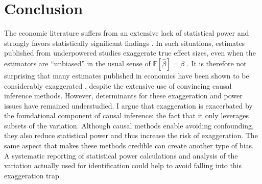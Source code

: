 \documentclass[usletter, 12pt]{article}
\begin{document}



\section{Conclusion} \label{conclusion}

	The economic literature suffers from an extensive lack of statistical power \citep{ioannidis_power_2017} and strongly favors statistically significant findings \citep[for instance]{rosenthal_file_1979, andrews_identification_2019, abadie_statistical_2020, brodeur_methods_2020}. In such situations, estimates published from underpowered studies exaggerate true effect sizes, even when the estimators are ``unbiased'' in the usual sense of $\mathbb{E}[\hat{\beta}] = \beta$ \citep{gelmanType2000, ioannidis_why_2008, gelman_beyond_2014}. It is therefore not surprising that many estimates published in economics have been shown to be considerably exaggerated \citep{camerer_evaluating_2016, ioannidis_power_2017}, despite the extensive use of convincing causal inference methods.  However, determinants for these exaggeration and power issues have remained understudied. I argue that exaggeration is exacerbated by the foundational component of causal inference: the fact that it only leverages subsets of the variation. Although causal methods enable avoiding confounding, they also reduce statistical power and thus increase the risk of exaggeration. The same aspect that makes these methods credible can create another type of bias. A systematic reporting of statistical power calculations and analysis of the variation actually used for identification could help to avoid falling into this exaggeration trap.
	
	

\end{document}
